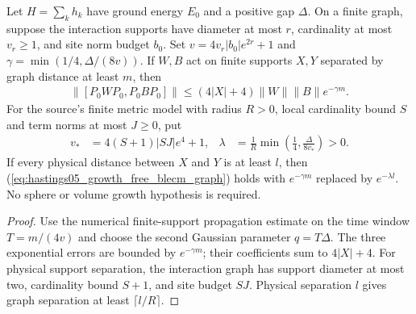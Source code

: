 \begin{lemma}
    \label{thm:hastings05_growth_free_blecm_separation}
    \leanok
    Let $H=\sum_kh_k$ have ground energy $E_0$ and a positive gap $\Delta$.
    On a finite graph, suppose the interaction supports have diameter at
    most $r$, cardinality at most $v_r\ge1$, and site norm budget $b_0$.
    Set $v=4v_r|b_0|e^{2r}+1$ and
    $\gamma=\min(1/4,\Delta/(8v))$. If $W,B$ act on finite supports $X,Y$
    separated by graph distance at least $m$, then
    \begin{align}
        \|[P_0WP_0,P_0BP_0]\|
        \le(4|X|+4)\|W\|\|B\|e^{-\gamma m}.
        \label{eq:hastings05_growth_free_blecm_graph}
    \end{align}
    For the source's finite metric model with radius $R>0$, local
    cardinality bound $S$ and term norms at most $J\ge0$, put
    \begin{align}
        v_* & =4(S+1)|SJ|e^4+1,
            & \lambda           & =\frac1R\min\left(\frac14,\frac{\Delta}{8v_*}\right)>0.
        \label{eq:hastings05_growth_free_blecm_rate}
    \end{align}
    If every physical distance between $X$ and $Y$ is at least $l$, then
    (\ref{eq:hastings05_growth_free_blecm_graph}) holds with
    $e^{-\gamma m}$ replaced by $e^{-\lambda l}$.
    No sphere or volume growth hypothesis is required.
\end{lemma}
\begin{proof}\leanok
    Use the numerical finite-support propagation estimate on the time
    window $T=m/(4v)$ and choose the second Gaussian parameter $q=T\Delta$.
    The three exponential errors are bounded by $e^{-\gamma m}$;
    their coefficients sum to $4|X|+4$. For physical support separation,
    the interaction graph has support diameter at most two, cardinality
    bound $S+1$, and site budget $SJ$. Physical separation $l$ gives graph
    separation at least $\lceil l/R\rceil$.
\end{proof}

